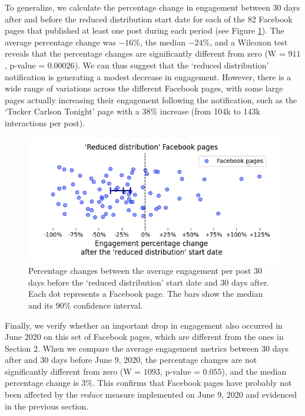 \documentclass[11pt,a4paper]{article}
\begin{document}
To generalize, we calculate the percentage change in engagement between 30 days after and before the reduced distribution start date for each of the 82 Facebook pages that published at least one post during each period (see Figure \ref{reduce_percentage_change}).
The average percentage change was $-16\%$, the median $-24\%$, and a Wilcoxon test reveals that the percentage changes are significantly different from zero (W = $911$, p-value = $0.00026$).
We can thus suggest that the `reduced distribution' notification is generating a modest decrease in engagement. 
However, there is a wide range of variations across the different Facebook pages, with some large pages actually increasing their engagement following the notification, such as the `Tucker Carlson Tonight' page with a $38\%$ increase (from 104k to 143k interactions per post).

\begin{figure}[!h]
\centering
\includegraphics[width=\linewidth]{./../figure/reduce_percentage_change.png}
\caption{Percentage changes between the average engagement per post 30 days before the `reduced distribution' start date and 30 days after. Each dot represents a Facebook page. The bars show the median and its $90\%$ confidence interval.}
\label{reduce_percentage_change}
\end{figure}
 
Finally, we verify whether an important drop in engagement also occurred in June 2020 on this set of Facebook pages, which are different from the ones in Section 2.
When we compare the average engagement metrics between 30 days after and 30 days before June 9, 2020, the percentage changes are not significantly different from zero (W = $1093$, p-value = $0.055$), and the median percentage change is $3\%$.
This confirms that Facebook pages have probably not been affected by the {\it reduce} measure implemented on June 9, 2020 and evidenced in the previous section.
\end{document}
